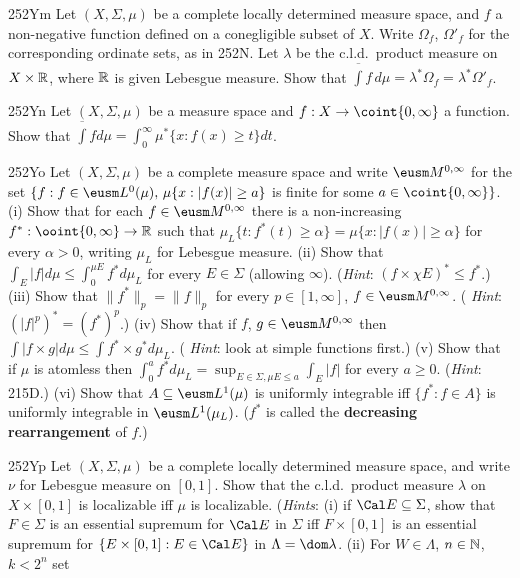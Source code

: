 {\spheader 252Ym Let $(X,\Sigma,\mu)$ be a complete locally determined
measure space, and $f$ a non-negative function defined on a conegligible
subset of $X$.   Write $\Omega_f$, $\Omega'_f$ for the corresponding
ordinate sets, as in 252N.   Let
$\lambda$ be the c.l.d.\ product measure on $X\times\Bbb R$, where
$\Bbb R$ is given Lebesgue measure.   Show that
$\overline{\int}f\,d\mu=\lambda^*\Omega_f=\lambda^*\Omega'_f$.

\spheader 252Yn Let $(X,\Sigma,\mu)$ be a measure space and
$f:X\to\coint{0,\infty}$ a function.   Show that
$\overline{\int}fd\mu=\int_0^{\infty}\mu^*\{x:f(x)\ge t\}dt$.

\spheader 252Yo Let $(X,\Sigma,\mu)$ be a complete measure space and
write $\eusm M^{0,\infty}$ for the set
$\{f:f\in\eusm L^0(\mu),\,\mu\{x:|f(x)|\ge a\}$ is finite for some
$a\in\coint{0,\infty}\}$.   (i) Show that for each
$f\in\eusm M^{0,\infty}$
there is a non-increasing $f^*:\ooint{0,\infty}\to\Bbb R$ such that
$\mu_L\{t:f^*(t)\ge\alpha\}=\mu\{x:|f(x)|\ge\alpha\}$ for
every $\alpha>0$, writing $\mu_L$ for Lebesgue measure.   (ii) Show that
$\int_E|f|d\mu\le\int_0^{\mu E}f^*d\mu_L$ for every $E\in\Sigma$
(allowing $\infty$).   ({\it Hint\/}:  $(f\times\chi E)^*\le f^*$.)
(iii) Show that $\|f^*\|_p=\|f\|_p$ for every $p\in[1,\infty]$,
$f\in\eusm M^{0,\infty}$.   ({\it
Hint\/}:  $(|f|^p)^*=(f^*)^p$.)   (iv) Show that if $f$,
$g\in\eusm M^{0,\infty}$ then
$\int|f\times g|d\mu\le\int f^*\times g^*d\mu_L$.   ({\it
Hint\/}:  look at simple functions first.)   (v) Show that if $\mu$ is
atomless then $\int_0^af^*d\mu_L=\sup_{E\in\Sigma,\mu E\le a}\int_E|f|$
for every $a\ge 0$.   ({\it Hint\/}:  215D.)   (vi) Show that
$A\subseteq\eusm L^1(\mu)$ is uniformly integrable iff $\{f^*:f\in A\}$
is uniformly integrable in $\eusm L^1(\mu_L)$.   ($f^*$ is called the
{\bf decreasing rearrangement} of $f$.)

\spheader 252Yp Let $(X,\Sigma,\mu)$ be a complete locally
determined measure space, and write $\nu$ for Lebesgue measure on
$[0,1]$.   Show
that the c.l.d.\ product measure $\lambda$ on $X\times[0,1]$ is
localizable iff $\mu$ is localizable.   ({\it Hints\/}: (i) if
$\Cal E\subseteq\Sigma$, show that $F\in\Sigma$ is an essential supremum
for $\Cal E$ in $\Sigma$ iff $F\times[0,1]$ is an essential supremum for
$\{E\times[0,1]:E\in\Cal E\}$ in $\Lambda=\dom\lambda$.   (ii) For
$W\in\Lambda$, $n\in\Bbb N$, $k<2^n$ set


}
